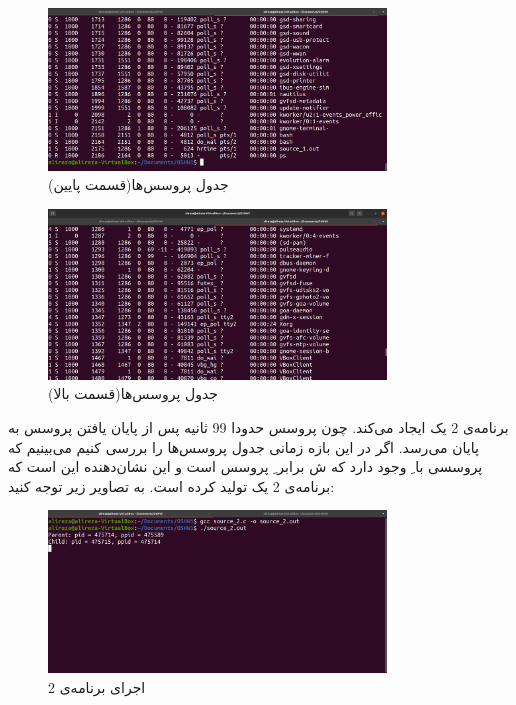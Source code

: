 \documentclass{article}
\begin{document}
\begin{figure}[H]
    \centering
    \includegraphics[width=0.8\textwidth]{figures/5.2.1.2.png}
    \caption{جدول پروسس‌ها(قسمت پایین)}
    \label{fig:fig1}
\end{figure}

\begin{figure}[H]
    \centering
    \includegraphics[width=0.8\textwidth]{figures/5.2.1.3.png}
    \caption{جدول پروسس‌ها(قسمت بالا)}
    \label{fig:fig1}
\end{figure}

برنامه‌ی 2 یک  ایجاد می‌کند. چون پروسس  حدودا 99 ثانیه پس از پایان یافتن پروسس  به پایان می‌رسد. اگر در این بازه زمانی جدول پروسس‌ها را بررسی کنیم می‌بینیم که پروسسی با ِ  وجود دارد که ش برابر ِ پروسس  است و این نشان‌دهنده این است که برنامه‌ی 2 یک  تولید کرده است. به تصاویر زیر توجه کنید:
\begin{figure}[H]
    \centering
    \includegraphics[width=0.8\textwidth]{figures/5.2.2.1.png}
    \caption{اجرای برنامه‌ی 2}
    \label{fig:fig1}
\end{figure}
\end{document}
